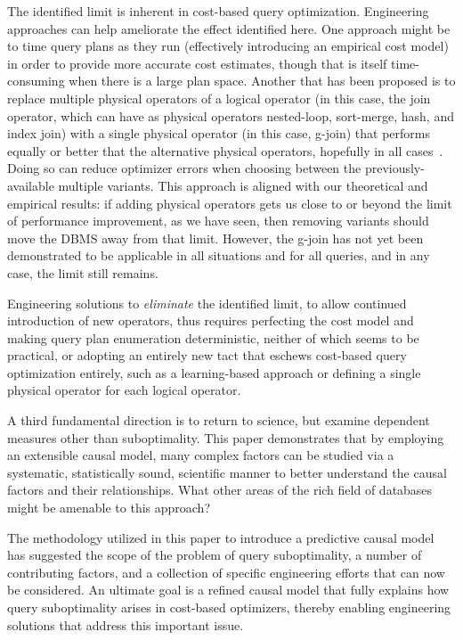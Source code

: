 \documentclass[prodmode,acmtods]{acmsmall}
\begin{document}
The identified limit is inherent in cost-based query
optimization. Engineering approaches can help ameliorate the effect
identified here. One approach might be to time query plans as they run
(effectively introducing an empirical cost model) in order to provide more
accurate cost estimates, though that is itself time-consuming
when there is a large plan space. Another that has been proposed is to
replace multiple physical operators of a logical  operator (in this case,
the join operator, which can have as physical operators nested-loop,
sort-merge, hash, and index join) with a single physical operator (in this
case, g-join) that performs equally or better that the alternative physical
operators, hopefully in all cases~\cite{Graefe12}. Doing so can reduce
optimizer errors when choosing between the previously-available multiple
variants. This approach is aligned with our theoretical and empirical
results: if adding physical operators gets us close to or beyond the limit
of performance improvement, as we have
seen, then removing variants should move the DBMS away from that
limit. However, the g-join has not yet been demonstrated to be applicable in
all situations and for all queries, and in any case, the limit still
remains.

Engineering solutions to {\em eliminate} the identified limit, to allow
continued introduction of new operators, thus requires perfecting the cost
model and making query plan enumeration deterministic, neither of which
seems to be practical, or adopting an entirely new tact that eschews
cost-based query optimization entirely, such as a
learning-based approach or defining a single physical operator for
each logical operator.

A third fundamental direction is to return to science, but examine dependent
measures other than suboptimality. This paper demonstrates that by employing an extensible causal model, many complex factors can be studied
via a systematic, statistically sound, scientific manner to better
understand the causal factors and their relationships.
What other areas of the
rich field of databases might be amenable to this approach?

The methodology utilized in this paper to introduce a predictive causal model has
suggested the scope of the problem of query suboptimality, a number of
contributing factors, and a collection of specific engineering efforts that
can now be considered. An ultimate goal is a refined causal model that
fully explains how query suboptimality arises in cost-based optimizers,
thereby enabling engineering solutions that address this important issue.
\end{document}
